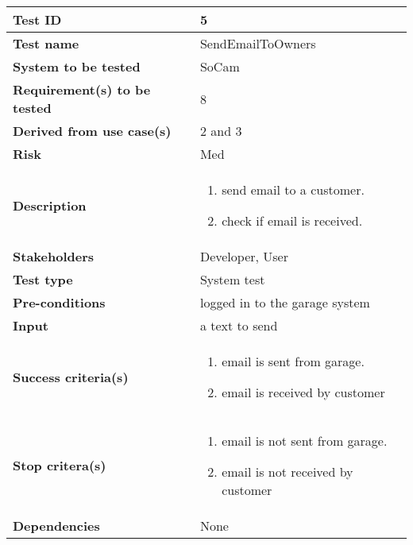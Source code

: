 		\begin{table}[H]
			\begin{tabular}{| p{4cm} | p{10cm} |}
			\hline
			\rowcolor{gray}
				{\bf Test ID} & 5 \\ \hline
				{\bf Test name} & SendEmailToOwners \\ \hline
				{\bf System to be tested} & SoCam \\ \hline
				{\bf Requirement(s) to be tested} & 8 \\ \hline
				{\bf Derived from use case(s)} & 2 and 3\\ \hline
				{\bf Risk} & Med \\ \hline
				{\bf Description} & 
					\begin{enumerate}
						\item send email to a customer.
						\item check if email is received.
					\end{enumerate}
				\\ \hline
				{\bf Stakeholders} & Developer, User \\ \hline
				{\bf Test type} & System test \\ \hline
				{\bf Pre-conditions} & logged in to the garage system \\ \hline
				{\bf Input} & a text to send \\ \hline
				{\bf Success criteria(s)} & 
					\begin{enumerate}
						\item email is sent from garage.
						\item email is received by customer
					\end{enumerate}
				\\ \hline
				{\bf Stop critera(s)} &  
					\begin{enumerate}
						\item email is not sent from garage.
						\item email is not  received by customer
					\end{enumerate} \\ \hline
				{\bf Dependencies} & None\\ \hline
			\end{tabular}
		\end{table}

